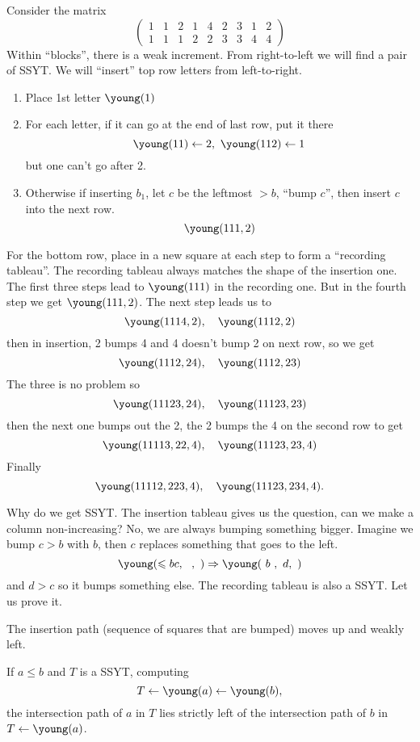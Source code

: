 \documentclass[12pt]{memoir}
\begin{document}
\begin{Ex}
    Consider the matrix 
    $$\begin{pmatrix}
        1&1&2&1&4&2&3&1&2\\
        1&1&1&2&2&3&3&4&4
    \end{pmatrix}$$
    Within ``blocks'', there is a weak increment. From right-to-left we will find a pair of SSYT. We will ``insert'' top row letters from left-to-right.
    \begin{enumerate}
        \item Place 1st letter $\young(1)$
        \item For each letter, if it can go at the end of last row, put it there 
        $$\young(11)\leftarrow 2,\ \young(112)\leftarrow 1$$
        but one can't go after 2.
        \item Otherwise if inserting $b_1$, let $c$ be the leftmost $>b$, ``bump $c$'', then insert $c$ into the next row. 
        $$\young(111,2)$$
    \end{enumerate}
    For the bottom row, place in a new square at each step to form a ``recording tableau''. The recording tableau always matches the shape of the insertion one. The first three steps lead to $\young(111)$ in the recording one. But in the fourth step we get $\young(111,2)$. The next step leads us to 
    $$\young(1114,2),\quad \young(1112,2)$$
    then in insertion, 2 bumps 4 and 4 doesn't bump 2 on next row, so we get 
    $$\young(1112,24),\quad \young(1112,23)$$
    The three is no problem so 
    $$\young(11123,24),\quad \young(11123,23)$$
    then the next one bumps out the 2, the 2 bumps the 4 on the second row to get 
    $$\young(11113,22,4),\quad \young(11123,23,4)$$
    Finally 
    $$\young(11112,223,4),\quad \young (11123,234,4).$$
\end{Ex}

Why do we get SSYT. The insertion tableau gives us the question, can we make a column non-increasing? No, we are always bumping something bigger. Imagine we bump $c>b$ with $b$, then $c$ replaces something that goes to the left.
$$\young(\leq bc,~~,~)\To\young(~b~,~d,~)$$
and $d>c$ so it bumps something else. The recording tableau is also a SSYT. Let us prove it. 

\begin{Lem}\label{lemma-key-lemma-SSYT}
    The insertion path (sequence of squares that are bumped) moves up and weakly left. 
\end{Lem}

\begin{Lem}\label{lemma-consec-inserts}
If $a\leq b$ and $T$ is a SSYT, computing 
$$T\leftarrow\young(a)\leftarrow\young(b),$$
the intersection path of $a$ in $T$ lies strictly left of the intersection path of $b$ in $T\leftarrow\young(a)$.
\end{Lem}
\end{document}
